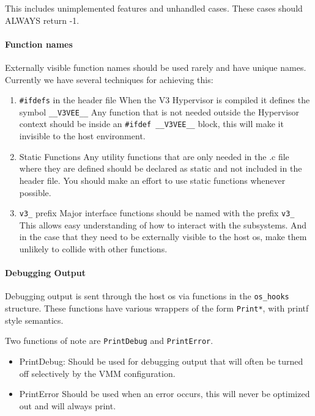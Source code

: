 \documentclass[11pt]{article}
\begin{document}
This includes unimplemented features and unhandled cases. These cases
should ALWAYS return -1. 


\paragraph*{Function names}
Externally visible function names should be used rarely and have
unique names. Currently we have several techniques for achieving this:

\begin{enumerate}
\item \verb.#ifdefs. in the header file
\newline
When the V3 Hypervisor is compiled it defines the symbol
\verb.__V3VEE__. Any function that is not needed outside the Hypervisor
context should be inside an \verb.#ifdef __V3VEE__. block, this will make it
invisible to the host environment.

\item Static Functions
\newline
Any utility functions that are only needed in the .c file where they
are defined should be declared as static and not included in the
header file. You should make an effort to use static functions
whenever possible. 

\item \verb.v3_. prefix
\newline
Major interface functions should be named with the prefix \verb.v3_. This
allows easy understanding of how to interact with the subsystems. And
in the case that they need to be externally visible to the host os,
make them unlikely to collide with other functions. 
\end{enumerate}

\paragraph*{Debugging Output}
Debugging output is sent through the host os via functions in the
\verb.os_hooks. structure. These functions have various wrappers of the form
\verb.Print*., with printf style semantics. 

Two functions of note are \verb.PrintDebug. and \verb.PrintError..

\begin{itemize}

\item PrintDebug:
\newline
Should be used for debugging output that will often be
turned off selectively by the VMM configuration. 

\item PrintError
\newline
Should be used when an error occurs, this will never be optimized out
and will always print. 
\end{itemize}
\end{document}
